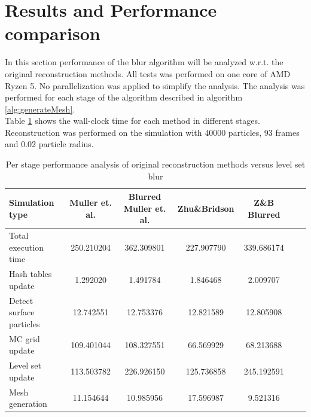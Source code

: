 \section{Results and Performance comparison}
In this section performance of the blur algorithm will be analyzed w.r.t. the original reconstruction methods. All tests was performed on one core of AMD Ryzen 5. No parallelization was applied to simplify the analysis. The analysis was performed for each stage of the algorithm described in algorithm \ref{alg:generateMesh}.\\ 
Table \ref{tab:perf_analysis} shows the wall-clock time for each method in different stages.
Reconstruction was performed on the simulation with 40000 particles, 93 frames and 0.02 particle radius.
\begin{table}[h]
	\begin{center}
		\scriptsize
		\begin{tabular}{|l|c|c|c|c|c|c|}
			\hline
			Simulation type & Muller et. al. & Blurred Muller et. al. & Zhu\&Bridson & Z\&B Blurred \\
			\hline
			Total execution time		&	250.210204	&	362.309801	&	227.907790	&	339.686174	\\
			Hash tables update			&	1.292020	&	1.491784	&	1.846468	&	2.009707	\\
			Detect surface particles	&	12.742551	&	12.753376	&	12.821589	&	12.805908	\\
			MC grid update				&	109.401044	&	108.327551	&	66.569929	&	68.213688	\\
			Level set update			&	113.503782	&	226.926150	&	125.736858	&	245.192591	\\
			Mesh generation				&	11.154644	&	10.985956	&	17.596987	&	9.521316	\\
			\hline
		\end{tabular}
	\end{center}
	\caption{Per stage performance analysis of original reconstruction methods versus level set blur}
	\label{tab:perf_analysis}
\end{table}

